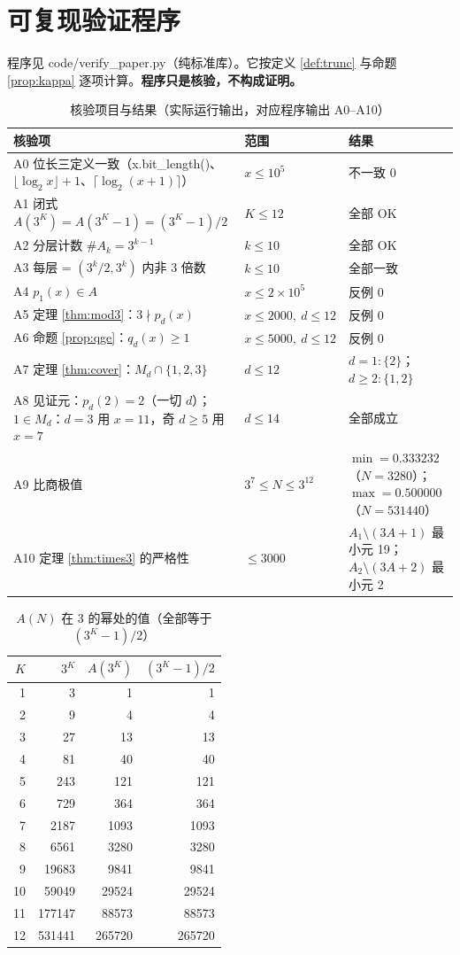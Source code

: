 \documentclass[11pt]{article}
\theoremstyle{definition}\newtheorem{definition}[theorem]{定义}
\theoremstyle{definition}\newtheorem{conjecture}[theorem]{猜想}
\theoremstyle{remark}\newtheorem{remark}[theorem]{注}
\begin{document}
\section{可复现验证程序}
程序见 code/verify\_paper.py（纯标准库）。它按定义 \ref{def:trunc} 与命题 \ref{prop:kappa} 逐项计算。\textbf{程序只是核验，不构成证明。}
\begin{table}[htbp]\centering\small
\caption{核验项目与结果（实际运行输出，对应程序输出 A0–A10）}
\label{tab:verify}
\begin{tabular}{lll}\toprule
核验项 & 范围 & 结果 \\ \midrule
A0 位长三定义一致（x.bit\_length()、$\lfloor\log_2x\rfloor+1$、$\lceil\log_2(x+1)\rceil$） & $x\le10^5$ & 不一致 0 \\
A1 闭式 $A(3^K)=A(3^K-1)=(3^K-1)/2$ & $K\le12$ & 全部 OK \\
A2 分层计数 $\#A_k=3^{k-1}$ & $k\le10$ & 全部 OK \\
A3 每层 = $(3^k/2,3^k)$ 内非 3 倍数 & $k\le10$ & 全部一致 \\
A4 $p_1(x)\in A$ & $x\le2\times10^5$ & 反例 0 \\
A5 定理 \ref{thm:mod3}：$3\nmid p_d(x)$ & $x\le2000,\ d\le12$ & 反例 0 \\
A6 命题 \ref{prop:qge}：$q_d(x)\ge1$ & $x\le5000,\ d\le12$ & 反例 0 \\
A7 定理 \ref{thm:cover}：$M_d\cap\{1,2,3\}$ & $d\le12$ & $d=1:\{2\}$；$d\ge2:\{1,2\}$ \\
A8 见证元：$p_d(2)=2$（一切 $d$）；$1\in M_d$：$d=3$ 用 $x=11$，奇 $d\ge5$ 用 $x=7$ & $d\le14$ & 全部成立 \\
A9 比商极值 & $3^7\le N\le3^{12}$ & $\min=0.333232$（$N=3280$）；$\max=0.500000$（$N=531440$） \\
A10 定理 \ref{thm:times3} 的严格性 & $\le3000$ & $A_1\setminus(3A+1)$ 最小元 19；$A_2\setminus(3A+2)$ 最小元 2 \\
\bottomrule\end{tabular}
\end{table}
\begin{table}[htbp]\centering\small
\caption{$A(N)$ 在 3 的幂处的值（全部等于 $(3^K-1)/2$）}
\label{tab:Apow}
\begin{tabular}{rrrr}\toprule
$K$ & $3^K$ & $A(3^K)$ & $(3^K-1)/2$ \\ \midrule
1 & 3 & 1 & 1 \\
2 & 9 & 4 & 4 \\
3 & 27 & 13 & 13 \\
4 & 81 & 40 & 40 \\
5 & 243 & 121 & 121 \\
6 & 729 & 364 & 364 \\
7 & 2187 & 1093 & 1093 \\
8 & 6561 & 3280 & 3280 \\
9 & 19683 & 9841 & 9841 \\
10 & 59049 & 29524 & 29524 \\
11 & 177147 & 88573 & 88573 \\
12 & 531441 & 265720 & 265720 \\
\bottomrule\end{tabular}
\end{table}
\end{document}
